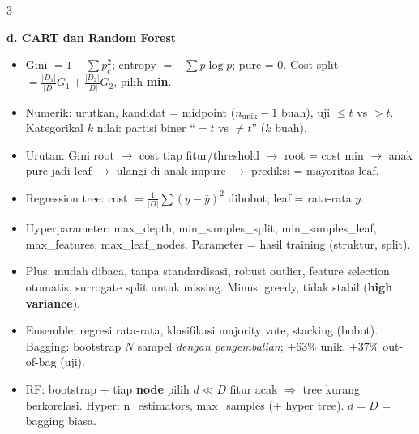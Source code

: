 \documentclass[8pt]{extarticle}
\newcommand{\sect}[1]{\par\vspace{1.5pt}\colorbox{black!12}{\parbox{\dimexpr\columnwidth-2\fboxsep}{\textbf{#1}}}\par\vspace{0.8pt}}
\begin{document}
\begin{multicols*}{3}
\sect{d. CART dan Random Forest}
\begin{itemize}
\item Gini $=1-\sum p_c^2$; entropy $=-\sum p\log p$; pure = 0. Cost split $=\frac{|D_1|}{|D|}G_1+\frac{|D_2|}{|D|}G_2$, pilih \textbf{min}.
\item Numerik: urutkan, kandidat = midpoint ($n_{\text{unik}}-1$ buah), uji $\le t$ vs $>t$. Kategorikal $k$ nilai: partisi biner ``$=t$ vs $\ne t$'' ($k$ buah).
\item Urutan: Gini root $\to$ cost tiap fitur/threshold $\to$ root = cost min $\to$ anak pure jadi leaf $\to$ ulangi di anak impure $\to$ prediksi = mayoritas leaf.
\item Regression tree: cost $=\frac1{|D|}\sum(y-\bar y)^2$ dibobot; leaf = rata-rata $y$.
\item Hyperparameter: max\_depth, \allowbreak min\_samples\_split, \allowbreak min\_samples\_leaf, \allowbreak max\_features, \allowbreak max\_leaf\_nodes. Parameter = hasil training (struktur, split).
\item Plus: mudah dibaca, tanpa standardisasi, robust outlier, feature selection otomatis, surrogate split untuk missing. Minus: greedy, tidak stabil (\textbf{high variance}).
\item Ensemble: regresi rata-rata, klasifikasi majority vote, stacking (bobot). Bagging: bootstrap $N$ sampel \emph{dengan pengembalian}; $\pm63\%$ unik, $\pm37\%$ out-of-bag (uji).
\item RF: bootstrap + tiap \textbf{node} pilih $d\ll D$ fitur acak $\Rightarrow$ tree kurang berkorelasi. Hyper: n\_estimators, max\_samples (+ hyper tree). $d=D$ = bagging biasa.
\end{itemize}

\end{multicols*}
\newpage
\end{document}
